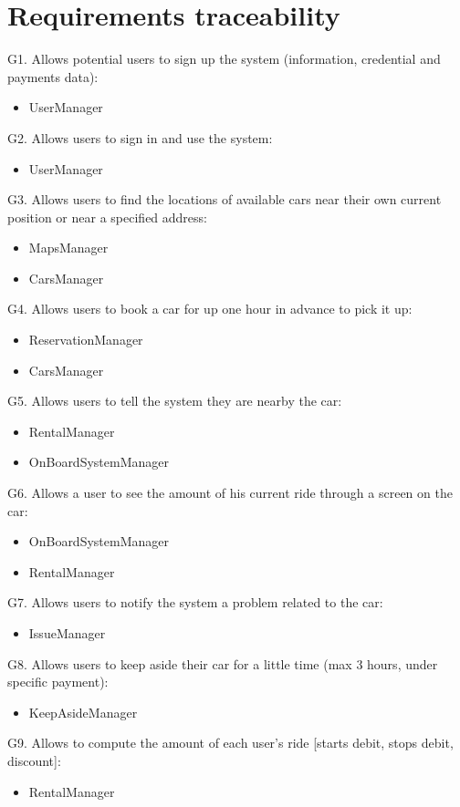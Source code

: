 \documentclass{scrreprt}
\begin{document}
\chapter{Requirements traceability}
G1. Allows potential users to sign up the system (information, credential and payments data):
\begin{itemize}
\item UserManager
\end{itemize}
G2. Allows users to sign in and use the system:
\begin{itemize}
\item UserManager
\end{itemize}
G3. Allows users to find the locations of available cars near their own current position or near a specified address:
\begin{itemize}
\item MapsManager
\item CarsManager
\end{itemize}
G4. Allows users to book a car for up one hour in advance to pick it up:
\begin{itemize}
\item ReservationManager
\item CarsManager
\end{itemize}
G5. Allows users to tell the system they are nearby the car:
\begin{itemize}
\item RentalManager
\item OnBoardSystemManager
\end{itemize}
G6. Allows a user to see the amount of his current ride through a screen on the car:
\begin{itemize}
\item OnBoardSystemManager
\item RentalManager
\end{itemize}
G7. Allows users to notify the system a problem related to the car:
\begin{itemize}
\item IssueManager
\end{itemize}
G8. Allows users to keep aside their car for a little time (max 3 hours, under specific payment):
\begin{itemize}
\item KeepAsideManager
\end{itemize}
G9. Allows to compute the amount of each user's ride [starts debit, stops debit, discount]:
\begin{itemize}
\item RentalManager
\end{itemize}
\end{document}
